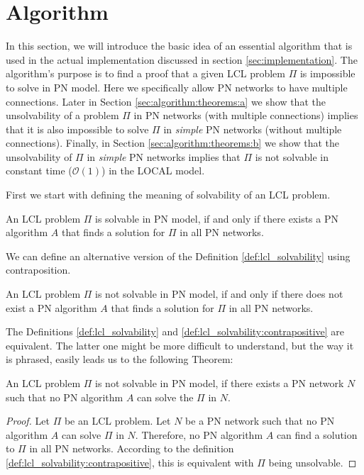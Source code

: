 
\section{Algorithm} \label{sec:algorithm}

In this section, we will introduce the basic idea of an essential algorithm that is used in the actual implementation discussed in section \ref{sec:implementation}.
The algorithm's purpose is to find a proof that a given LCL problem $\Pi$ is impossible to solve in PN model.
Here we specifically allow PN networks to have multiple connections.
Later in Section \ref{sec:algorithm:theorems:a} we show that the unsolvability of a problem $\Pi$ in PN networks (with multiple connections) implies that it is also impossible to solve $\Pi$ in \emph{simple} PN networks (without multiple connections).
Finally, in Section \ref{sec:algorithm:theorems:b} we show that the unsolvability of $\Pi$ in \emph{simple} PN networks implies that $\Pi$ is not solvable in constant time ($\mathcal{O}(1)$) in the LOCAL model.

First we start with defining the meaning of solvability of an LCL problem.
\begin{definition} \label{def:lcl_solvability}
    An LCL problem $\Pi$ is solvable in PN model, if and only if there exists a PN algorithm $A$ that finds a solution for $\Pi$ in all PN networks.
\end{definition}

We can define an alternative version of the Definition \ref{def:lcl_solvability} using contraposition.
\begin{definition} \label{def:lcl_solvability:contrapositive}
An LCL problem $\Pi$ is not solvable in PN model, if and only if there does not exist a PN algorithm $A$ that finds a solution for $\Pi$ in all PN networks.
\end{definition}

The Definitions \ref{def:lcl_solvability} and \ref{def:lcl_solvability:contrapositive} are equivalent. The latter one might be more difficult to understand, but the way it is phrased, easily leads us to the following Theorem:

\begin{theorem} \label{thm:lcl_unsolvability}
    An LCL problem $\Pi$ is not solvable in PN model, if there exists a PN network $N$ such that no PN algorithm $A$ can solve the $\Pi$ in $N$.
\end{theorem}
\begin{proof}
    Let $\Pi$ be an LCL problem.
    Let $N$ be a PN network such that no PN algorithm $A$ can solve $\Pi$ in $N$.
    Therefore, no PN algorithm $A$ can find a solution to $\Pi$ in all PN networks.
    According to the definition \ref{def:lcl_solvability:contrapositive}, this is equivalent with $\Pi$ being unsolvable.
\end{proof}

